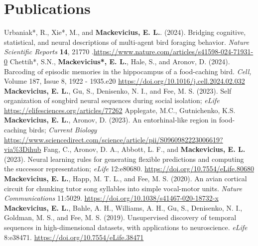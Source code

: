 \documentclass[11pt,a4paper]{moderncv}
\begin{document}
\section{Publications}
Urbaniak*, R., Xie*, M.,  and \textbf{Mackevicius, E. L.}. (2024). Bridging cognitive, statistical, and neural descriptions of multi-agent bird foraging behavior.  \emph{Nature Scientific Reports} \textbf{14}, 21770 .\url{https://www.nature.com/articles/s41598-024-71931-0}
\newline
\newline
Chettih*, S.N., \textbf{Mackevicius*, E. L.}, Hale, S., and Aronov, D.  (2024). Barcoding of episodic memories in the hippocampus of a food-caching bird. \emph{Cell, }Volume 187, Issue 8, 1922 - 1935.e20
\url{https://doi.org/10.1016/j.cell.2024.02.032}
\newline
\newline
\textbf{Mackevicius, E. L.}, Gu, S., Denisenko, N. I.,  and  Fee, M. S. (2023). Self organization of songbird neural sequences during social isolation; \textit{eLife} \url{https://elifesciences.org/articles/77262}
\newline
\newline
Applegate, M.C., Gutnichenko, K.S. \textbf{Mackevicius, E. L.}, Aronov, D. (2023). An entorhinal-like region in food-caching birds; \textit{Current Biology} \url{https://www.sciencedirect.com/science/article/pii/S0960982223006619?via%3Dihub}
\newline
\newline
Fang, C., Aronov, D. A., Abbott, L. F., and \textbf{Mackevicius, E. L.} (2023). Neural learning rules for generating flexible predictions and computing the successor representation; \emph{eLife} 12:e80680. \url{https://doi.org/10.7554/eLife.80680}
\newline
\newline
\textbf{Mackevicius, E. L.}, Happ, M. T. L.,  and  Fee, M. S. (2020). An avian cortical circuit for chunking tutor song syllables into simple vocal-motor units. \textit{Nature Communications} 11:5029. \url{https://doi.org/10.1038/s41467-020-18732-x}
\newline
\newline
\textbf{Mackevicius, E. L.}, Bahle, A. H., Williams, A. H., Gu, S., Denisenko, N. I., Goldman, M. S.,  and  Fee, M. S. (2019). Unsupervised discovery of temporal sequences in high-dimensional datasets, with applications to neuroscience. \textit{eLife} 8:e38471. \url{https://doi.org/10.7554/eLife.38471}
\newline
\end{document}
